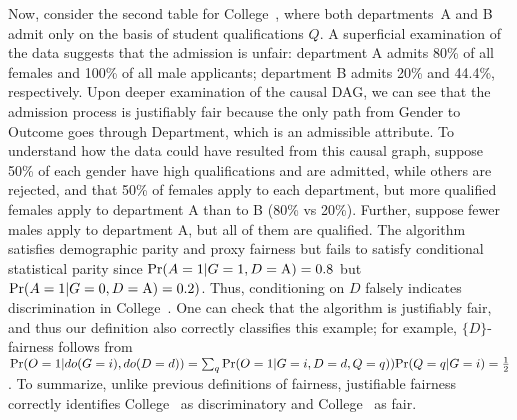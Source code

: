 \documentclass[11pt]{article}
\begin{document}
\begin{example}
  Now, consider the second table for College~, where both
  departments~A and B admit only on the basis of student
  qualifications $Q$.  A superficial examination of the data suggests
  that the admission is unfair: department A admits 80\% of all
  females and 100\% of all male applicants; department B admits 20\%
  and 44.4\%, respectively.  Upon deeper examination of the causal DAG,
  we can see that the admission process is justifiably fair because
  the only path from Gender to Outcome goes through Department,
  which is an admissible attribute.  To understand how the data could
  have resulted from this causal graph, suppose 50\% of each gender
  have high qualifications and are admitted, while others are
  rejected, and that 50\% of females apply to each department, but
  more qualified females apply to department A than to B (80\%
  vs 20\%). Further, suppose fewer males apply to department A, but
  all of them are qualified.  The algorithm satisfies demographic
  parity and proxy fairness but fails to satisfy conditional
  statistical parity since ${\tt \mathrm{Pr}}(A=1|G=1,D=\text{A})=0.8$ but
  ${\tt \mathrm{Pr}}(A=1|G=0,D=\text{A})=0.2)$.  Thus, conditioning on $D$ falsely
  indicates discrimination in College~. One can check that the
  algorithm is justifiably fair, and thus our definition also
  correctly classifies this example; for example, $\{D\}$-fairness
  follows from
  ${\tt \mathrm{Pr}}(O=1|do({G}={i}),do(D=d))= \sum_{q}{\tt \mathrm{Pr}}(O=1|G=i,D=d,Q=q))
  \nonumber {\tt \mathrm{Pr}}(Q=q|G=i)= \frac{1}{2}$.
 To summarize, unlike previous definitions of fairness, justifiable  fairness correctly identifies College~ as discriminatory and College~ as fair.

\end{example}
\end{document}
